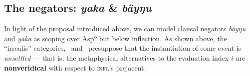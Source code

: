%	
%






\subsection{The negators: \textit{yaka} \& \textit{bäyŋu}}

In light of the proposal introduced above, we can model clausal negators \textit{bäyŋu} and \textit{yaka} as scoping over Aspº but below inflection. As shown above, the ``irrealis'' categories, \II~and \IV~presuppose that the instantiation of some event is \textit{unsettled} --- that is, the metaphysical alternatives to the evaluation index $ i $ are \textbf{nonveridical} with respect to \textsc{infl}'s prejacent. 

